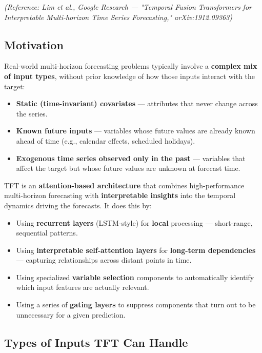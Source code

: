 \documentclass[12pt,openany]{book}
\theoremstyle{definition}
\theoremstyle{remark}
\begin{document}
\emph{(Reference: Lim et al., Google Research --- "Temporal Fusion Transformers for Interpretable Multi-horizon Time Series Forecasting," arXiv:1912.09363)}

\subsection{Motivation}

Real-world multi-horizon forecasting problems typically involve a \textbf{complex mix of input types}, without prior knowledge of how those inputs interact with the target:

\begin{itemize}
\item \textbf{Static (time-invariant) covariates} --- attributes that never change across the series.
\item \textbf{Known future inputs} --- variables whose future values are already known ahead of time (e.g., calendar effects, scheduled holidays).
\item \textbf{Exogenous time series observed only in the past} --- variables that affect the target but whose future values are unknown at forecast time.

\end{itemize}
TFT is an \textbf{attention-based architecture} that combines high-performance multi-horizon forecasting with \textbf{interpretable insights} into the temporal dynamics driving the forecasts. It does this by:

\begin{itemize}
\item Using \textbf{recurrent layers} (LSTM-style) for \textbf{local} processing --- short-range, sequential patterns.
\item Using \textbf{interpretable self-attention layers} for \textbf{long-term dependencies} --- capturing relationships across distant points in time.
\item Using specialized \textbf{variable selection} components to automatically identify which input features are actually relevant.
\item Using a series of \textbf{gating layers} to suppress components that turn out to be unnecessary for a given prediction.

\end{itemize}

\subsection{Types of Inputs TFT Can Handle}
\end{document}
